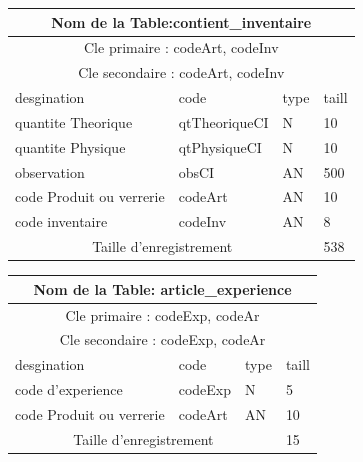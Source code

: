 \vspace{2cm}

\begin{tabular}{ |p{5cm}||p{4cm}|p{3cm}|p{3cm}|  }
    \hline
    \multicolumn{4}{|c|}{Nom de la Table:contient\_inventaire } \\
    \hline
    \multicolumn{4}{|c|}{Cle primaire : codeArt, codeInv} \\
    \hline
    \multicolumn{4}{|c|}{Cle secondaire : codeArt, codeInv  } \\
    \hline
    \hline
    desgination&code&type&taill \\
    \hline
    
    quantite Theorique&qtTheoriqueCI&N&10 \\
    quantite Physique&qtPhysiqueCI&N&10 \\
    observation&obsCI&AN&500 \\
    code Produit ou verrerie&codeArt&AN&10 \\
    code inventaire&codeInv&AN&8 \\
    \hline
    \hline
    \multicolumn{3}{|c|}{Taille d’enregistrement} & 538\\
    \hline
\end{tabular}

\vspace{2cm}

\begin{tabular}{ |p{5cm}||p{4cm}|p{3cm}|p{3cm}|  }
    \hline
    \multicolumn{4}{|c|}{Nom de la Table: article\_experience } \\
    \hline
    \multicolumn{4}{|c|}{Cle primaire : codeExp, codeAr } \\
    \hline
    \multicolumn{4}{|c|}{Cle secondaire : codeExp, codeAr } \\
    \hline
    \hline
    desgination&code&type&taill \\
    \hline
    
    code d'experience&codeExp&N&5 \\
    code Produit ou verrerie&codeArt&AN&10 \\
    \hline
    \hline
    \multicolumn{3}{|c|}{Taille d’enregistrement} & 15\\
    \hline
\end{tabular}

\vspace{2cm}

